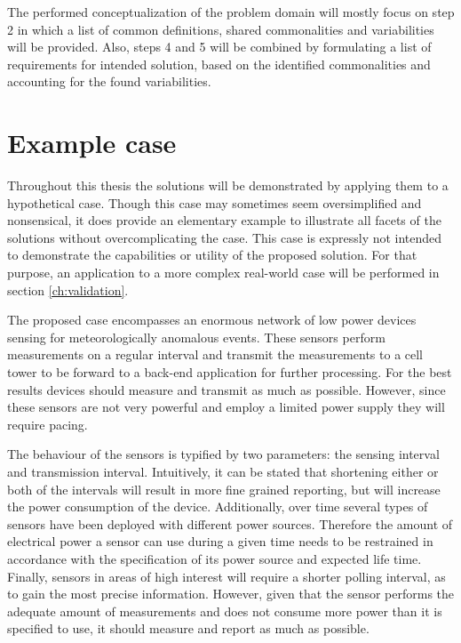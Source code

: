 The performed conceptualization of the problem domain will mostly focus on step 2 in which a list of common definitions, shared commonalities and variabilities will be provided. Also, steps 4 and 5 will be combined by formulating a list of requirements for intended solution, based on the identified commonalities and accounting for the found variabilities. 

\section{Example case}
\label{sec:example_case}
Throughout this thesis the solutions will be demonstrated by applying them to a hypothetical case. Though this case may sometimes seem oversimplified and nonsensical, it does provide an elementary example to illustrate all facets of the solutions without overcomplicating the case. This case is expressly not intended to demonstrate the capabilities or utility of the proposed solution. For that purpose, an application to a more complex real-world case will be performed in section \ref{ch:validation}. 

The proposed case encompasses an enormous network of low power devices sensing for meteorologically anomalous events. These sensors perform measurements on a regular interval and transmit the measurements to a cell tower to be forward to a back-end application for further processing. For the best results devices should measure and transmit as much as possible. However, since these sensors are not very powerful and employ a limited power supply they will require pacing.

The behaviour of the sensors is typified by two parameters: the sensing interval and transmission interval. Intuitively, it can be stated that shortening either or both of the intervals will result in more fine grained reporting, but will increase the power consumption of the device. Additionally, over time several types of sensors have been deployed with different power sources. Therefore the amount of electrical power a sensor can use during a given time needs to be restrained in accordance with the specification of its power source and expected life time. Finally, sensors in areas of high interest will require a shorter polling interval, as to gain the most precise information. However, given that the sensor performs the adequate amount of measurements and does not consume more power than it is specified to use, it should measure and report as much as possible.

